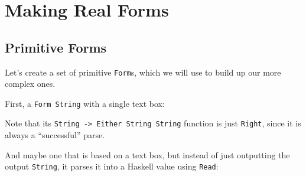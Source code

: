 \documentclass[]{article}
\newenvironment{Shaded}{}{}
\newcommand{\CommentTok}[1]{\textcolor[rgb]{0.38,0.63,0.69}{\textit{#1}}}
\newcommand{\DataTypeTok}[1]{\textcolor[rgb]{0.56,0.13,0.00}{#1}}
\newcommand{\FunctionTok}[1]{\textcolor[rgb]{0.02,0.16,0.49}{#1}}
\newcommand{\NormalTok}[1]{#1}
\newcommand{\OperatorTok}[1]{\textcolor[rgb]{0.40,0.40,0.40}{#1}}
\newcommand{\OtherTok}[1]{\textcolor[rgb]{0.00,0.44,0.13}{#1}}
\begin{document}
\hypertarget{making-real-forms}{%
\section{Making Real Forms}\label{making-real-forms}}

\hypertarget{primitive-forms}{%
\subsection{Primitive Forms}\label{primitive-forms}}

Let's create a set of primitive \texttt{Form}s, which we will use to build up
our more complex ones.

First, a \texttt{Form\ String} with a single text box:

\begin{Shaded}
\end{Shaded}

Note that its \texttt{String\ -\textgreater{}\ Either\ String\ String} function
is just \texttt{Right}, since it is always a ``successful'' parse.

And maybe one that is based on a text box, but instead of just outputting the
output \texttt{String}, it parses it into a Haskell value using \texttt{Read}:
\end{document}
